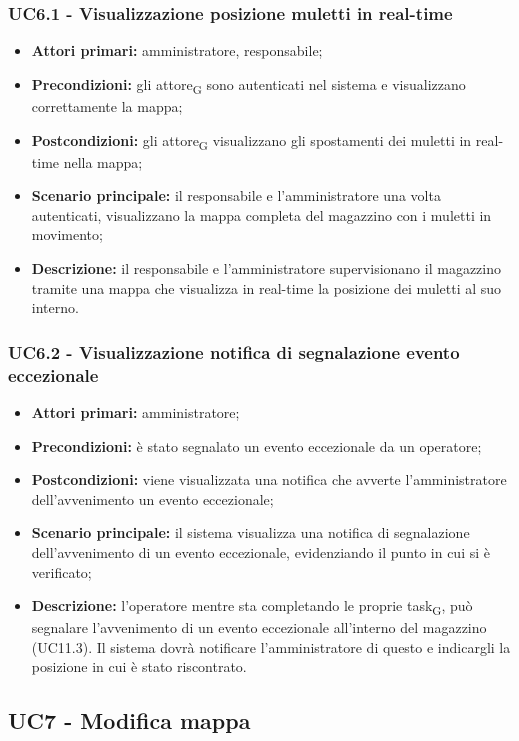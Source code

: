 \subsubsection{UC6.1 - Visualizzazione posizione muletti in real-time}
\begin{itemize}
	\item 	\textbf{Attori primari:} amministratore, responsabile;
	\item 	\textbf{Precondizioni:} gli attore\textsubscript{G} sono autenticati nel sistema e visualizzano correttamente la mappa;
	\item 	\textbf{Postcondizioni:} gli attore\textsubscript{G} visualizzano gli spostamenti dei muletti in real-time nella mappa;
	\item 	\textbf{Scenario principale:} il responsabile e l'amministratore una volta autenticati, visualizzano la mappa completa del magazzino con i muletti in movimento;
	\item 	\textbf{Descrizione:} il responsabile e l'amministratore supervisionano il magazzino tramite una mappa che visualizza in real-time la posizione dei muletti al suo interno.
\end{itemize}

\subsubsection{UC6.2 - Visualizzazione notifica di segnalazione evento eccezionale}
\begin{itemize}
	\item 	\textbf{Attori primari:} amministratore;
	\item 	\textbf{Precondizioni:} è stato segnalato un evento eccezionale da un operatore;
	\item 	\textbf{Postcondizioni:} viene visualizzata una notifica che avverte l'amministratore dell'avvenimento un evento eccezionale;
	\item 	\textbf{Scenario principale:} il sistema visualizza una notifica di segnalazione dell'avvenimento di un evento eccezionale, evidenziando il punto in cui si è verificato;
	\item 	\textbf{Descrizione:} l'operatore mentre sta completando le proprie task\textsubscript{G}, può segnalare l'avvenimento di un evento eccezionale all'interno del magazzino (UC11.3). Il sistema dovrà notificare l'amministratore di questo e indicargli la posizione in cui è stato riscontrato.
\end{itemize}

\subsection{UC7 - Modifica mappa}



